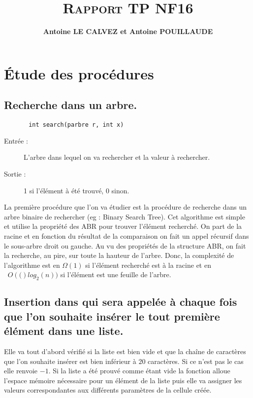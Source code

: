 \documentclass[a4paper, 12pt, leqno]{report}
\title{\textsc{\textbf{Rapport TP NF16}}}
\author{\textbf{Antoine LE CALVEZ et Antoine POUILLAUDE}}
\theoremstyle{plain}
\newcommand{\bigO}[1]{\ensuremath{\mathop{}\mathopen{}O\mathopen{}\left(#1\right)}}
\begin{document}
    \maketitle
    \tableofcontents									
    \chapter{\'Etude des proc\'edures}		
        \section{Recherche dans un arbre.}        
            \begin{verbatim}
       int search(parbre r, int x)
            \end{verbatim}
            \begin{description}
            \item[Entrée :] L'arbre dans lequel on va rechercher et la valeur à rechercher.
            \item[Sortie :] 1 si l'élément à été trouvé, 0 sinon.
            \end{description}


        La première procédure que l'on va étudier est la procédure de recherche dans un arbre binaire de rechercher (eg : Binary Search Tree). Cet algorithme est simple et utilise la propriété des ABR pour trouver l'élément recherché. On part de la racine et en fonction du résultat de la comparaison on fait un appel récursif dans le sous-arbre droit ou gauche. Au vu des propriétés de la structure ABR, on fait la recherche, au pire, sur toute la hauteur de l'arbre. Donc, la complexité de l'algorithme est en $\Omega(1)$ si l'élément recherché est à la racine et en $\bigO(log_2{}(n))$ si l'élément est une feuille de l'arbre.
		
		
		\section{Insertion dans qui sera appelée à chaque fois que l'on souhaite insérer le tout première élément dans une liste.}     
            
            Elle va tout d'abord vérifié si la liste est bien vide et que la chaîne de caractères que l'on souhaite insérer est bien inférieur à $20$ caractères. Si ce n'est pas le cas elle renvoie $-1$. Si la liste a été prouvé comme étant vide la fonction alloue l'espace mémoire nécessaire pour un élément de la liste puis elle va assigner les valeurs correspondantes aux différents paramètres de la cellule créée.\\
            
\end{document}
